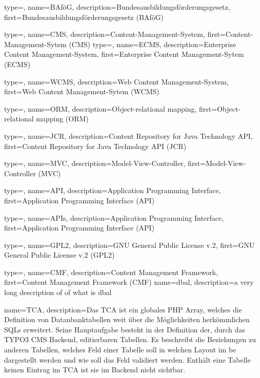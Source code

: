{
	type=\acronymtype,
	name={BAföG},
	description={Bundesausbildungsförderungsgesetz},
	first={Bundesausbildungsförderungsgesetz (BAföG)}
}

{
	type=\acronymtype,
	name={CMS},
	description={Content-Management-System},
	first={Content-Management-Sytem (CMS)}
}
{
	type=\acronymtype,
	name={ECMS},
	description={Enterprise Content Management-System},
	first={Enterprise Content Management-Sytem (ECMS)}
}

{
	type=\acronymtype,
	name={WCMS},
	description={Web Content Management-System},
	first={Web Content Management-Sytem (WCMS)}
}

{
	type=\acronymtype,
	name={ORM},
	description={Object-relational mapping},
	first={Object-relational mapping (ORM)}
}

{
	type=\acronymtype,
	name={JCR},
	description={Content Repository for Java Technology API},
	first={Content Repository for Java Technology API (JCR)}
}

{
	type=\acronymtype,
	name={MVC},
	description={Model-View-Controller},
	first={Model-View-Controller (MVC)}
}

{
	type=\acronymtype,
	name={API},
	description={Application Programming Interface},
	first={Application Programming Interface (API)}
}

{
	type=\acronymtype,
	name={APIs},
	description={Application Programming Interface},
	first={Application Programming Interface (API)}
}

{
	type=\acronymtype,
	name={GPL2},
	description={GNU General Public License v.2},
	first={GNU General Public License v.2 (GPL2)}
}

{
	type=\acronymtype,
	name={CMF},
	description={Content Management Framework},
	first={Content Management Framework (CMF)}
}
{
	name={dbal},
	description={a very long description of of what is dbal}
}

{
	name={TCA},
	description={Das TCA ist ein globales PHP Array, welches die Definition von Datanbanktabellen weit über die Möglichkeiten herkömmlichen SQLs erweitert. Seine Hauptaufgabe besteht in der Definition der, durch das TYPO3 CMS Backend, editierbaren Tabellen. Es beschreibt die Beziehungen zu anderen Tabellen, welches Feld einer Tabelle soll in welchen Layout im \gls{be} dargestellt werden und wie soll das Feld validiert werden. Enthält eine Tabelle keinen Eintrag im TCA ist sie im Backend nicht sichtbar.}
}
